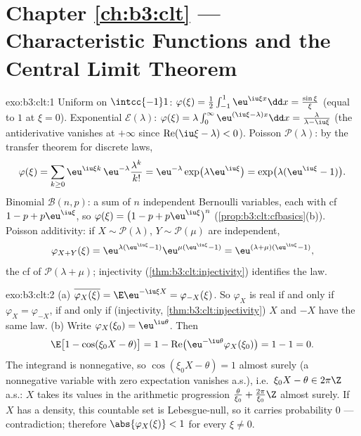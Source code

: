 \section*{Chapter \ref{ch:b3:clt} --- Characteristic
Functions and the Central Limit Theorem}

\begin{solution}{exo:b3:clt:1}
Uniform on $\intcc{-1}1$: $\varphi(\xi) =
\frac12\int_{-1}^1\eu^{\iu\xi x}\dd x =
\frac{\sin\xi}{\xi}$ (equal to $1$ at $\xi = 0$).
Exponential $\mathcal E(\lambda)$: $\varphi(\xi) =
\lambda\int_0^\infty\eu^{(\iu\xi - \lambda)x}\dd x =
\frac{\lambda}{\lambda - \iu\xi}$ (the antiderivative
vanishes at $+\infty$ since $\operatorname{Re}(\iu\xi -
\lambda) < 0$). Poisson $\mathcal P(\lambda)$: by the
transfer theorem for discrete laws,
\[
\varphi(\xi) = \sum_{k\geq0}\eu^{\iu\xi
k}\,\eu^{-\lambda}\frac{\lambda^k}{k!}
= \eu^{-\lambda}\exp\bigl(\lambda\eu^{\iu\xi}\bigr)
= \exp\bigl(\lambda(\eu^{\iu\xi} - 1)\bigr).
\]
Binomial $\mathcal B(n, p)$: a sum of $n$ independent
Bernoulli variables, each with cf $1 - p + p\eu^{\iu\xi}$,
so $\varphi(\xi) = \bigl(1 - p + p\eu^{\iu\xi}\bigr)^n$
(\cref{prop:b3:clt:cfbasics}(b)). Poisson additivity: if $X
\sim \mathcal P(\lambda)$, $Y \sim \mathcal P(\mu)$ are
independent,
\[
\varphi_{X+Y}(\xi) = \eu^{\lambda(\eu^{\iu\xi}-1)}
\eu^{\mu(\eu^{\iu\xi}-1)} =
\eu^{(\lambda+\mu)(\eu^{\iu\xi}-1)},
\]
the cf of $\mathcal P(\lambda + \mu)$; injectivity
(\cref{thm:b3:clt:injectivity}) identifies the law.
\end{solution}

\begin{solution}{exo:b3:clt:2}
(a) $\overline{\varphi_X(\xi)} = \E\eu^{-\iu\xi X} =
\varphi_{-X}(\xi)$. So $\varphi_X$ is real if and only if
$\varphi_X = \varphi_{-X}$, if and only if (injectivity,
\cref{thm:b3:clt:injectivity}) $X$ and $-X$ have the same
law.
(b) Write $\varphi_X(\xi_0) = \eu^{\iu\theta}$. Then
\[
\E\bigl[1 - \cos(\xi_0X - \theta)\bigr]
= 1 - \operatorname{Re}\bigl(\eu^{-\iu\theta}
\varphi_X(\xi_0)\bigr) = 1 - 1 = 0 .
\]
The integrand is nonnegative, so $\cos(\xi_0X - \theta) = 1$
almost surely (a nonnegative variable with zero expectation
vanishes a.s.), i.e.\ $\xi_0X - \theta \in 2\pi\Z$ a.s.: $X$
takes its values in the arithmetic progression
$\frac{\theta}{\xi_0} + \frac{2\pi}{\xi_0}\Z$ almost surely.
If $X$ has a density, this countable set is Lebesgue-null,
so it carries probability $0$ --- contradiction; therefore
$\abs{\varphi_X(\xi)} < 1$ for every $\xi \neq 0$.
\end{solution}


